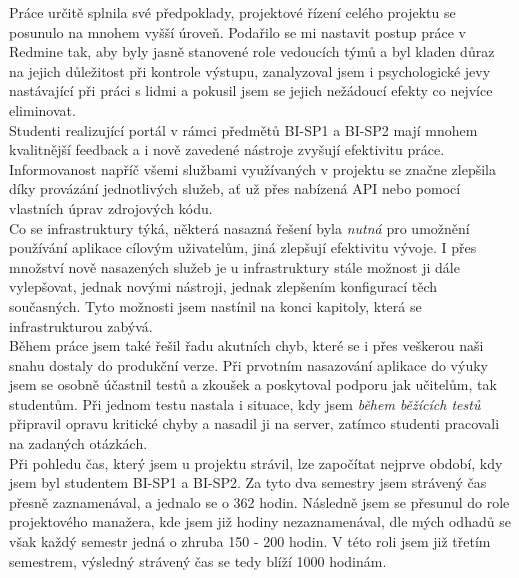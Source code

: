 Práce určitě splnila své předpoklady, projektové řízení celého projektu se posunulo na mnohem vyšší úroveň. Podařilo se mi nastavit postup práce v Redmine tak, aby byly jasně stanovené role vedoucích týmů a byl kladen důraz na jejich důležitost při kontrole výstupu, zanalyzoval jsem i psychologické jevy nastávající při práci s lidmi a pokusil jsem se jejich nežádoucí efekty co nejvíce eliminovat.\\
Studenti realizující portál v rámci předmětů BI-SP1 a BI-SP2 mají mnohem kvalitnější feedback a i nově zavedené nástroje zvyšují efektivitu práce. Informovanost napříč všemi službami využívaných v projektu se značne zlepšila díky provázání jednotlivých služeb, ať už přes nabízená API nebo pomocí vlastních úprav zdrojových kódu.\\
Co se infrastruktury týká, některá nasazná řešení byla \emph{nutná} pro umožnění používání aplikace cílovým uživatelům, jiná zlepšují efektivitu vývoje. I přes množství nově nasazených služeb je u infrastruktury stále možnost ji dále vylepšovat, jednak novými nástroji, jednak zlepšením konfigurací těch současných. Tyto možnosti jsem nastínil na konci kapitoly, která se infrastrukturou zabývá.\\
Během práce jsem také řešil řadu akutních chyb, které se i přes veškerou naši snahu dostaly do produkční verze. Při prvotním nasazování aplikace do výuky jsem se osobně účastnil testů a zkoušek a poskytoval podporu jak učitelům, tak studentům. Při jednom testu nastala i situace, kdy jsem \emph{během běžících testů} připravil opravu kritické chyby a nasadil ji na server, zatímco studenti pracovali na zadaných otázkách.\\
Při pohledu čas, který jsem u projektu strávil, lze započítat nejprve období, kdy jsem byl studentem BI-SP1 a BI-SP2. Za tyto dva semestry jsem strávený čas přesně zaznamenával, a jednalo se o 362 hodin. Následně jsem se přesunul do role projektového manažera, kde jsem již hodiny nezaznamenával, dle mých odhadů se však každý semestr jedná o zhruba 150 - 200 hodin. V této roli jsem již třetím semestrem, výsledný strávený čas se tedy blíží 1000 hodinám.
